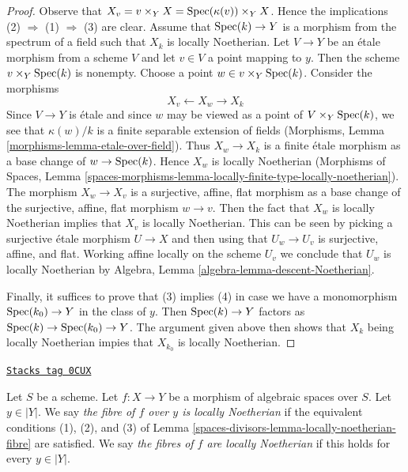 \begin{proof}
Observe that $X_v = v \times_Y X = \operatorname{Spec}(\kappa(v)) \times_Y X$.
Hence the implications (2) $\Rightarrow$ (1) $\Rightarrow$ (3) are clear.
Assume that $\operatorname{Spec}(k) \to Y$ is a morphism from the spectrum of a field
such that $X_k$ is locally Noetherian. Let $V \to Y$ be an \'etale morphism
from a scheme $V$ and let $v \in V$ a point mapping to $y$.
Then the scheme $v \times_Y \operatorname{Spec}(k)$ is nonempty. Choose a
point $w \in v \times_Y \operatorname{Spec}(k)$. Consider the morphisms
$$
X_v \longleftarrow X_w \longrightarrow X_k
$$
Since $V \to Y$ is \'etale and since $w$ may be viewed as a point of
$V \times_Y \operatorname{Spec}(k)$, we see that $\kappa(w)/k$
is a finite separable extension of fields
(Morphisms, Lemma \ref{morphisms-lemma-etale-over-field}).
Thus $X_w \to X_k$ is a finite \'etale morphism as a base change of
$w \to \operatorname{Spec}(k)$. Hence $X_w$ is locally Noetherian
(Morphisms of Spaces, Lemma
\ref{spaces-morphisms-lemma-locally-finite-type-locally-noetherian}).
The morphism $X_w \to X_v$ is a surjective, affine, flat morphism
as a base change of the surjective, affine, flat morphism $w \to v$.
Then the fact that $X_w$ is locally Noetherian implies that
$X_v$ is locally Noetherian. This can be seen by picking a
surjective \'etale morphism $U \to X$ and then using that
$U_w \to U_v$ is surjective, affine, and flat. Working
affine locally on the scheme $U_v$ we conclude
that $U_w$ is locally Noetherian by
Algebra, Lemma \ref{algebra-lemma-descent-Noetherian}.

\medskip\noindent
Finally, it suffices to prove that (3) implies (4)
in case we have a monomorphism $\operatorname{Spec}(k_0) \to Y$ in the class of $y$.
Then $\operatorname{Spec}(k) \to Y$ factors as $\operatorname{Spec}(k) \to \operatorname{Spec}(k_0) \to Y$.
The argument given above then shows that $X_k$ being
locally Noetherian impies that $X_{k_0}$ is locally Noetherian.
\end{proof}

\begin{definition}
\label{spaces-divisors-definition-locally-Noetherian-fibre}
\href{https://stacks.math.columbia.edu/tag/0CUX}{\texttt{Stacks tag 0CUX}}

Let $S$ be a scheme. Let $f : X \to Y$ be a morphism of algebraic spaces
over $S$. Let $y \in |Y|$. We say {\it the fibre of $f$ over $y$ is
locally Noetherian} if the equivalent conditions (1), (2), and (3)
of Lemma \ref{spaces-divisors-lemma-locally-noetherian-fibre} are satisfied.
We say {\it the fibres of $f$ are locally Noetherian} if this
holds for every $y \in |Y|$.
\end{definition}

